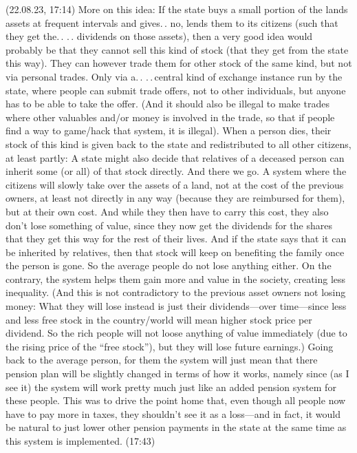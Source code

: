 \documentclass{report}
\begin{document}
(22.08.23, 17:14) More on this idea: If the state buys a small portion of the lands assets at frequent intervals and gives.\,. no, lends them to its citizens (such that they get the.\,. %
.\,. dividends on those assets), then a very good idea would probably be that they cannot sell this kind of stock (that they get from the state this way). They can however trade them for other stock of the same kind, but not via personal trades. Only via a.\,. .\,.\,central kind of exchange instance run by the state, where people can submit trade offers, not to other individuals, but anyone has to be able to take the offer. (And it should also be illegal to make trades where other valuables and/or money is involved in the trade, so that if people find a way to game/hack that system, it is illegal). When a person dies, their stock of this kind is given back to the state and redistributed to all other citizens, at least partly: A state might also decide that relatives of a deceased person can inherit some (or all) of that stock directly. And there we go. A system where the citizens will slowly take over the assets of a land, not at the cost of the previous owners, at least not directly in any way (because they are reimbursed for them), but at their own cost. And while they then have to carry this cost, they also don't lose something of value, since they now get the dividends for the shares that they get this way for the rest of their lives. And if the state says that it can be inherited by relatives, then that stock will keep on benefiting the family once the person is gone. So the average people do not lose anything either. On the contrary, the system helps them gain more and value in the society, creating less inequality. (And this is not contradictory to the previous asset owners not losing money: What they will lose instead is just their dividends---over time---since less and less free stock in the country/world will mean higher stock price per dividend. So the rich people will not loose anything of value immediately (due to the rising price of the ``free stock''), but they will lose future earnings.) %
Going back to the average person, for them the system will just mean that there pension plan will be slightly changed in terms of how it works, namely since (as I see it) the system will work pretty much just like an added pension system for these people. This was to drive the point home that, even though all people now have to pay more in taxes, they shouldn't see it as a loss---and in fact, it would be natural to just lower other pension payments in the state at the same time as this system is implemented. (17:43)
\end{document}
